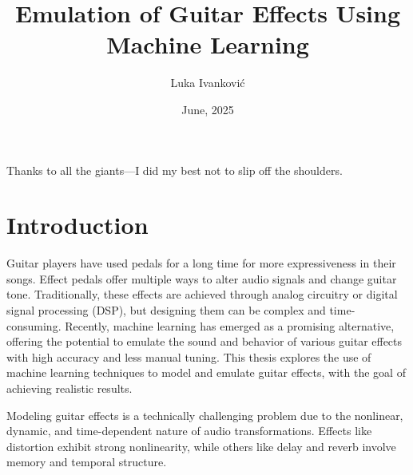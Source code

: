 \documentclass[masterthesis]{fer}
\title{Emulation of Guitar Effects Using Machine Learning}
\author{Luka Ivanković}
\date{June, 2025}
\begin{document}






\begin{zahvale}
  Thanks to all the giants—I did my best not to slip off the shoulders.
\end{zahvale}


\mainmatter


\tableofcontents


\chapter{Introduction}
\label{chp:introduction}

Guitar players have used pedals for a long time for more expressiveness in their songs. Effect pedals offer multiple ways to alter audio signals and change guitar tone. Traditionally, these effects are achieved through analog circuitry or digital signal processing (DSP), but designing them can be complex and time-consuming. Recently, machine learning has emerged as a promising alternative, offering the potential to emulate the sound and behavior of various guitar effects with high accuracy and less manual tuning. This thesis explores the use of machine learning techniques to model and emulate guitar effects, with the goal of achieving realistic results.

Modeling guitar effects is a technically challenging problem due to the nonlinear, dynamic, and time-dependent nature of audio transformations. Effects like distortion exhibit strong nonlinearity, while others like delay and reverb involve memory and temporal structure. 
\end{document}

